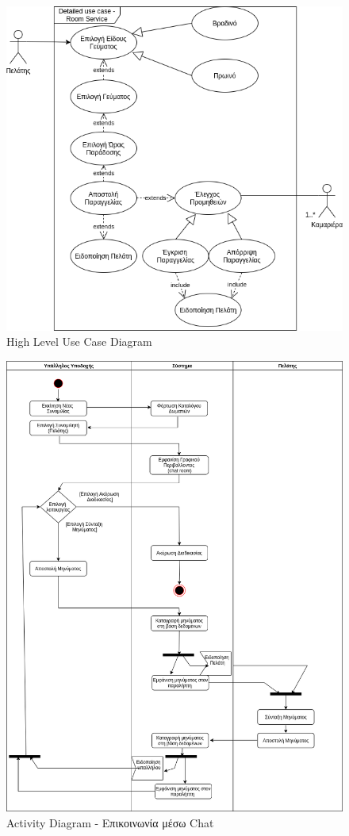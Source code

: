 \begin{figure}[H]
	\centering
	\includegraphics[width=1\textwidth]{Images/Low_level_use_case-Room service}
	\caption{High Level Use Case Diagram}
	\label{Low level use case - Room service}
\end{figure}

\begin{figure}[H]
	\centering
	\includegraphics[width=1\textwidth]{Images/Activity-Chat}
	\caption{Activity Diagram - Επικοινωνία μέσω Chat}
	\label{Activity - Chat }
\end{figure}

